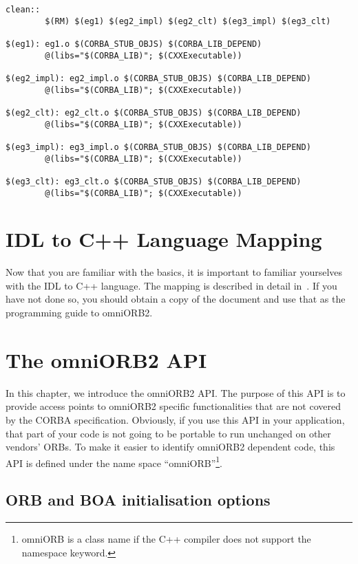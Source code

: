 \documentclass[11pt,twoside,onecolumn]{book}
\begin{document}
{\begin{verbatim}
clean::
        $(RM) $(eg1) $(eg2_impl) $(eg2_clt) $(eg3_impl) $(eg3_clt)

$(eg1): eg1.o $(CORBA_STUB_OBJS) $(CORBA_LIB_DEPEND)
        @(libs="$(CORBA_LIB)"; $(CXXExecutable))

$(eg2_impl): eg2_impl.o $(CORBA_STUB_OBJS) $(CORBA_LIB_DEPEND)
        @(libs="$(CORBA_LIB)"; $(CXXExecutable))

$(eg2_clt): eg2_clt.o $(CORBA_STUB_OBJS) $(CORBA_LIB_DEPEND)
        @(libs="$(CORBA_LIB)"; $(CXXExecutable))

$(eg3_impl): eg3_impl.o $(CORBA_STUB_OBJS) $(CORBA_LIB_DEPEND)
        @(libs="$(CORBA_LIB)"; $(CXXExecutable))

$(eg3_clt): eg3_clt.o $(CORBA_STUB_OBJS) $(CORBA_LIB_DEPEND)
        @(libs="$(CORBA_LIB)"; $(CXXExecutable))

\end{verbatim}
}

\chapter{IDL to C++ Language Mapping}

Now that you are familiar with the basics, it is important to
familiar yourselves with the IDL to C++ language. The mapping is described
in detail in~\cite{corba2-spec}. If you have not done so, you should obtain
a copy of the document and use that as the programming guide to
omniORB2.

%

\chapter{The omniORB2 API}

In this chapter, we introduce the omniORB2 API. The purpose
of this API is to provide access points to omniORB2 specific
functionalities that are not covered by the CORBA specification.
Obviously, if you use this API in your application, that part of your code
is not going to be portable to run unchanged on other vendors' ORBs. To
make it easier to identify omniORB2 dependent code, this API is defined
under the name space ``omniORB''\footnote{omniORB is a class name if the
C++ compiler does not support the namespace keyword.}.

\section{ORB and BOA initialisation options}
\end{document}

